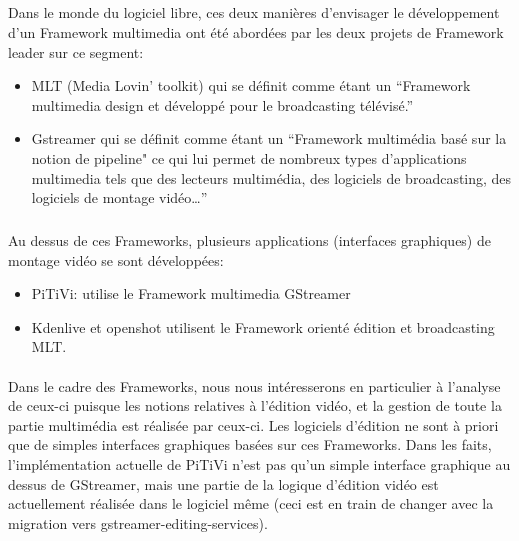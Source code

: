 \subparagraph{}

Dans le monde du logiciel libre, ces deux manières d'envisager le
développement d'un Framework multimedia ont été abordées par les
deux projets de Framework leader sur ce segment:

\begin {itemize}

  \item {MLT (Media Lovin' toolkit) qui se définit comme
  étant un ``Framework multimedia design
    et développé pour le broadcasting télévisé.''}

  \item {Gstreamer qui se définit comme étant un ``Framework multimédia
    basé sur la notion de pipeline" ce qui lui permet de nombreux types
    d'applications multimedia tels que des lecteurs multimédia, des
    logiciels de broadcasting, des logiciels de montage vidéo\ldots''}

\end {itemize}

\subparagraph {}

Au dessus de ces Frameworks, plusieurs applications (interfaces
graphiques) de montage vidéo se sont développées:

\begin {itemize}

  \item {PiTiVi: utilise le Framework multimedia GStreamer}

  \item {Kdenlive et openshot utilisent le Framework
  orienté édition et broadcasting MLT.}

\end {itemize}

\paragraph {}

Dans le cadre des Frameworks, nous nous intéresserons en particulier
à l'analyse de ceux-ci puisque les notions relatives à l'édition
vidéo, et la gestion de toute la partie multimédia est réalisée
par ceux-ci. Les logiciels d'édition ne sont à priori que de simples
interfaces graphiques basées sur ces Frameworks. Dans les faits,
l'implémentation actuelle de PiTiVi n'est pas qu'un simple interface
graphique au dessus de GStreamer, mais une partie de la logique
d'édition vidéo est actuellement réalisée dans le logiciel même
(ceci est en train de changer avec la migration \cite{PitviPortToGes}
vers gstreamer-editing-services\cite{PresentationOfGes}).

